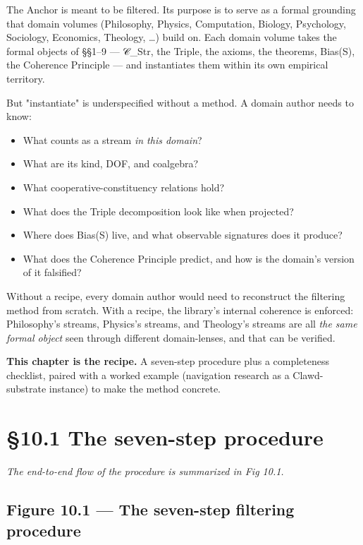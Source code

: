 \documentclass[11pt, openany]{book}
\newcommand{\sectionbreak}{\clearpage}
\begin{document}
The Anchor is meant to be filtered. Its purpose is to serve as a formal grounding that domain volumes (Philosophy, Physics, Computation, Biology, Psychology, Sociology, Economics, Theology, …) build on. Each domain volume takes the formal objects of §§1–9 --- 𝒞\_\allowbreak{}Str, the Triple, the axioms, the theorems, Bias(S), the Coherence Principle --- and instantiates them within its own empirical territory.

But "instantiate" is underspecified without a method. A domain author needs to know:

\begin{itemize}
\item What counts as a stream \textit{in this domain}?
\item What are its kind, DOF, and coalgebra?
\item What cooperative-constituency relations hold?
\item What does the Triple decomposition look like when projected?
\item Where does Bias(S) live, and what observable signatures does it produce?
\item What does the Coherence Principle predict, and how is the domain's version of it falsified?
\end{itemize}

Without a recipe, every domain author would need to reconstruct the filtering method from scratch. With a recipe, the library's internal coherence is enforced: Philosophy's streams, Physics's streams, and Theology's streams are all \textit{the same formal object} seen through different domain-lenses, and that can be verified.

\textbf{This chapter is the recipe.} A seven-step procedure plus a completeness checklist, paired with a worked example (navigation research as a Clawd-substrate instance) to make the method concrete.

\sectionbreak

\section{§10.1 The seven-step procedure}

\textit{The end-to-end flow of the procedure is summarized in Fig 10.1.}

\subsection{Figure 10.1 --- The seven-step filtering procedure}
\end{document}
